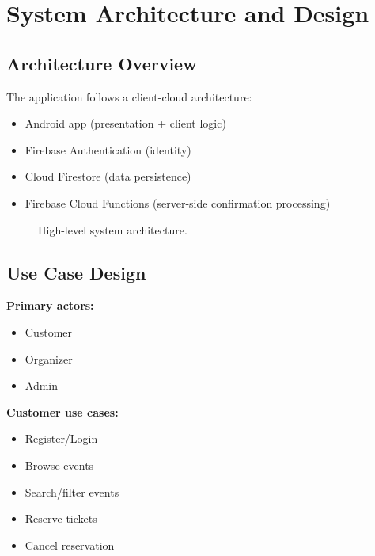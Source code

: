 \documentclass[12pt,a4paper]{article}
\begin{document}
\section{System Architecture and Design}

\subsection{Architecture Overview}

The application follows a client-cloud architecture:
\begin{itemize}
    \item Android app (presentation + client logic)
    \item Firebase Authentication (identity)
    \item Cloud Firestore (data persistence)
    \item Firebase Cloud Functions (server-side confirmation processing)
\end{itemize}

\begin{figure}[h!]
\centering
{}
\caption{High-level system architecture.}
\end{figure}

\subsection{Use Case Design}

\textbf{Primary actors:}
\begin{itemize}
    \item Customer
    \item Organizer
    \item Admin
\end{itemize}

\textbf{Customer use cases:}
\begin{itemize}
    \item Register/Login
    \item Browse events
    \item Search/filter events
    \item Reserve tickets
    \item Cancel reservation
\end{itemize}
\end{document}
